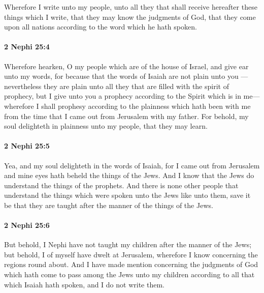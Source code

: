 			Wherefore I write unto my people,
			unto all they that shall receive hereafter these things which I write,
			that they may know the judgments of God,
			that they come upon all nations according to the word which he hath spoken.

		\paragraph{2 Nephi 25:4} %
			\label{2NEPHI-25-4}

			Wherefore hearken, O my people which are of the house of Israel,
			and give ear unto my words,
			for because that the words of Isaiah are not plain unto you
			---nevertheless they are plain unto all they that are filled with the spirit of prophecy,
			but I give unto you a prophecy according to the Spirit which is in me---
			wherefore I shall prophesy according to the plainness
			which hath been with me from the time that I came out from Jerusalem with my father.
			For behold, my soul delighteth in plainness unto my people, that they may learn.

		\paragraph{2 Nephi 25:5} %
			\label{2NEPHI-25-5}

			Yea, and my soul delighteth in the words of Isaiah,
			for I came out from Jerusalem
			and mine eyes hath beheld the things of the Jews.
			And I know that the Jews do understand the things of the prophets.
			And there is none other people
			that understand the things which were spoken unto the Jews
			like unto them,
			save it be that they are taught after the manner of the things of the Jews.

		\paragraph{2 Nephi 25:6} %
			\label{2NEPHI-25-6}

			But behold, I Nephi have not taught my children after the manner of the Jews;
			but behold, I of myself have dwelt at Jerusalem,
			wherefore I know concerning the regions round about.
			And I have made mention concerning the judgments of God
			which hath come to pass among the Jews
			unto my children
			according to all that which Isaiah hath spoken,
			and I do not write them.


